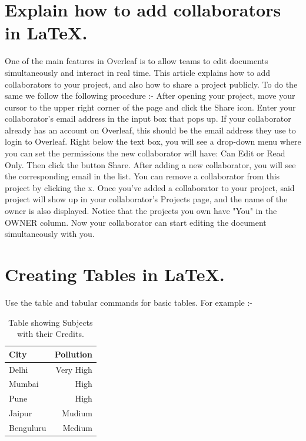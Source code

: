 \documentclass[a4paper]{article}
\begin{document}
\section{Explain how to add collaborators in LaTeX.}
One of the main features in Overleaf is to allow teams to edit documents simultaneously and interact in real time. This article explains how to add collaborators to your project, and also how to share a project publicly.
To do the same we follow the following procedure :-
\newline
After opening your project, move your cursor to the upper right corner of the page and click the Share icon.
\newline
Enter your collaborator's email address in the input box that pops up. If your collaborator already has an account on Overleaf, this should be the email address they use to login to Overleaf. Right below the text box, you will see a drop-down menu where you can set the permissions the new collaborator will have: Can Edit or Read Only. Then click the button Share.
\newline
After adding a new collaborator, you will see the corresponding email in the list. You can remove a collaborator from this project by clicking the x.
\newline
Once you've added a collaborator to your project, said project will show up in your collaborator's Projects page, and the name of the owner is also displayed. Notice that the projects you own have "You" in the OWNER column. Now your collaborator can start editing the document simultaneously with you.
\section{Creating Tables in LaTeX.}
Use the table and tabular commands for basic tables. For example :-
\newline
    \begin{table}
    \centering
    \begin{tabular}{|l|r|}
    \hline
    City & Pollution \\\hline
    Delhi & Very High \\ \hline
    Mumbai & High \\ \hline
    Pune & High \\ \hline
    Jaipur & Mudium \\ \hline
    Benguluru & Medium \\ \hline
    \end{tabular}
\caption{\label{tab:widgets}Table showing Subjects with their Credits.}
\end{table}
\end{document}
